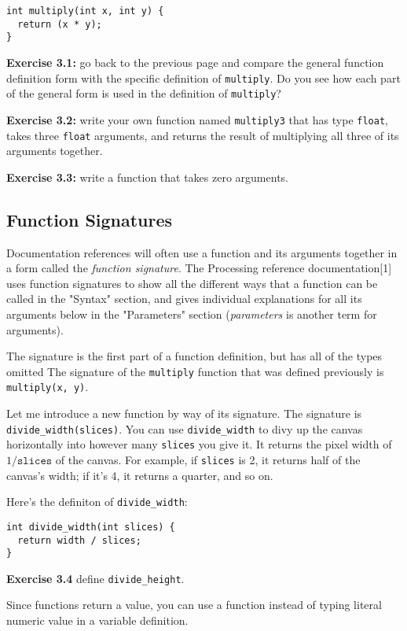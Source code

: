 \documentclass[
]{leaflet}
\begin{document}
\begin{lstlisting}
int multiply(int x, int y) {
  return (x * y);
}
\end{lstlisting}

\textbf{Exercise 3.1:} go back to the previous page and compare the general function definition form with the specific definition of \texttt{multiply}.
Do you see how each part of the general form is used in the definition of \texttt{multiply}?

\textbf{Exercise 3.2:} write your own function named \texttt{multiply3} that has type \texttt{float}, takes three \texttt{float} arguments, and returns the result of multiplying all three of its arguments together.

\textbf{Exercise 3.3:} write a function that takes zero arguments.

\subsection{Function Signatures}

Documentation references will often use a function and its arguments together in a form called the \textit{function signature}.
The Processing reference documentation[1] uses function signatures to show all the different ways that a function can be called in the "Syntax" section, and gives individual explanations for all its arguments below in the "Parameters" section (\textit{parameters} is another term for arguments).

The signature is the first part of a function definition, but has all of the types omitted
The signature of the \texttt{multiply} function that was defined previously is \texttt{multiply(x, y)}.

Let me introduce a new function by way of its signature.
The signature is \texttt{divide\_width(slices)}.
You can use \texttt{divide\_width} to divy up the canvas horizontally into however many \texttt{slices} you give it.
It returns the pixel width of $1/\texttt{slices}$ of the canvas.
For example, if \texttt{slices} is 2, it returns half of the canvas's width; if it's 4, it returns a quarter, and so on.

Here's the definiton of \texttt{divide\_width}:
\begin{lstlisting}
int divide_width(int slices) {
  return width / slices;
}
\end{lstlisting}

\textbf{Exercise 3.4} define \texttt{divide\_height}.

Since functions return a value, you can use a function instead of typing literal numeric value in a variable definition.
\end{document}
